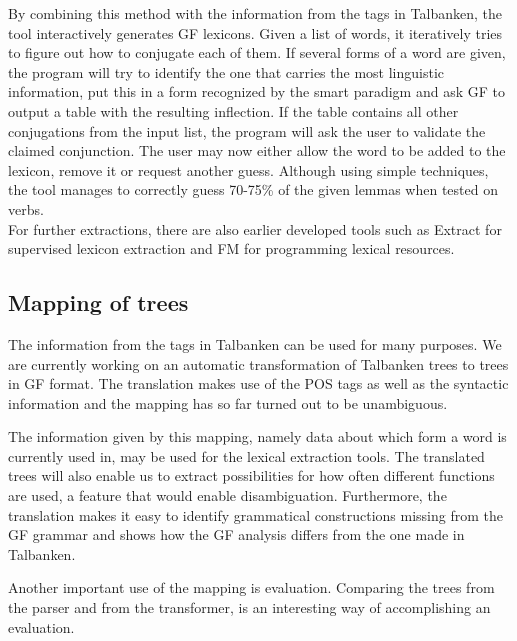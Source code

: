 \documentclass[submission]{eptcs} %
\begin{document}
By combining this method with the information from the tags in Talbanken,
the tool interactively generates GF lexicons. 
Given a list of words, it iteratively
tries to figure out how to conjugate each of them. If several forms of a word are 
given, the program will try to identify the one that carries the most linguistic
information, put this in a form recognized by the smart paradigm and ask GF to output
a table with the resulting inflection. 
If the table contains all other conjugations from the input list,
the program will ask the  user to
validate the claimed conjunction. The user may now either
allow the word to be added to the lexicon, remove it or request another guess.
Although using simple techniques, the tool 
manages to correctly guess 70-75\% of the given lemmas when tested on
verbs.\\
For further extractions, there are also earlier developed tools such as
Extract for supervised lexicon extraction and
FM\cite{MarkusForsberg2007} for programming lexical resources.



\subsection{Mapping of trees}
The information from the tags in Talbanken can be used for many purposes.
We are currently working on an automatic transformation of Talbanken trees 
to trees in GF format. The translation makes use of the POS tags as well as
the syntactic information and the mapping has so far turned out to be unambiguous. 

The information given by this mapping, namely data about which form a word is
currently used in, may be used for the lexical extraction
tools.%
The translated trees will also enable us to extract possibilities for how often
different functions are used, a feature that would enable disambiguation.
Furthermore, the translation makes it easy to identify grammatical constructions
missing from the GF grammar and shows how the GF analysis differs from the one made
in Talbanken.

Another important use of the mapping is evaluation. Comparing the trees
from the parser and from the transformer, is an interesting way of
accomplishing an evaluation.
\end{document}
